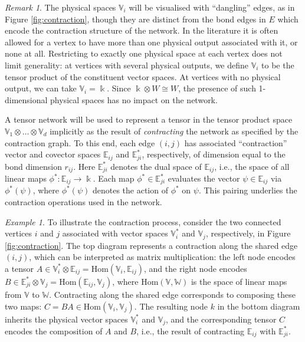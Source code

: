 \documentclass{amsart}
\theoremstyle{plain}
\theoremstyle{definition}
\theoremstyle{remark}
\newtheorem{remark}[theorem]{Remark}
\newtheorem{example}[theorem]{Example}
\begin{document}
\begin{remark}
	The physical spaces $\mathbb V_i$ will be visualised with ``dangling'' edges, as in Figure \ref{fig:contraction}, though they are distinct from the bond edges in $E$ which encode the contraction structure of the network. In the literature it is often allowed for a vertex to have more than one physical output associated with it, or none at all. Restricting to exactly one physical space at each vertex does not limit generality: at vertices with several physical outputs, we define $\mathbb V_i$ to be the tensor product of the constituent vector spaces. At vertices with no physical output, we can take $\mathbb V_i=\Bbbk$. Since $\Bbbk\otimes W\cong W$, the presence of such 1-dimensional physical spaces has no impact on the network. 
\end{remark}

A tensor network will be used to represent a tensor in the tensor product space $\mathbb V_1\otimes\dots\otimes\mathbb V_d$ implicitly as the result of \textit{contracting} the network as specified by the contraction graph. To this end, each edge $(i,j)$ has associated ``contraction'' vector and covector spaces $\mathbb E_{ij}$ and $\mathbb E_{ji}^*$, respectively, of dimension equal to the bond dimension $r_{ij}$. Here $\mathbb E_{ji}^*$ denotes the dual space of $\mathbb E_{ij}$, i.e., the space of all linear maps $\phi^* : \mathbb E_{ij} \to \Bbbk$. Each map $\phi^* \in \mathbb E_{ji}^*$ evaluates the vector $\psi \in \mathbb E_{ij}$ via $ \phi^*(\psi)$, where $\phi^*(\psi)$ denotes the action of $\phi^*$ on $\psi$. This pairing underlies the contraction operations used in the network.

\begin{example}\label{ex:contraction}
To illustrate the contraction process, consider the two connected vertices $i$ and $j$ associated with vector spaces $\mathbb V_i^*$ and $\mathbb V_j$, respectively, in Figure \ref{fig:contraction}. The top diagram represents a contraction along the shared edge $(i,j)$, which can be interpreted as matrix multiplication: the left node encodes a tensor $A \in \mathbb V_i^* \otimes \mathbb E_{ij} = \mathrm{Hom}(\mathbb V_i, \mathbb E_{ij})$, and the right node encodes $B \in \mathbb E_{ji}^* \otimes \mathbb V_j = \mathrm{Hom}(\mathbb E_{ij}, \mathbb V_j)$, where $\mathrm{Hom}(\mathbb V, \mathbb W)$ is the space of linear maps from $\mathbb V$ to $\mathbb W$. Contracting along the shared edge corresponds to composing these two maps: $C = BA \in \mathrm{Hom}(\mathbb V_i, \mathbb V_j)$. The resulting node $k$ in the bottom diagram inherits the physical vector spaces $\mathbb V_i^*$ and $\mathbb V_j$, and the corresponding tensor $C$ encodes the composition of $A$ and $B$, i.e., the result of contracting $\mathbb E_{ij}$ with $\mathbb E_{ji}^*$.
\end{example}
\end{document}
